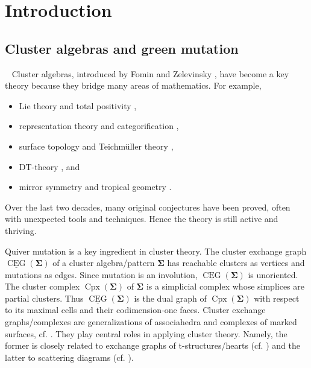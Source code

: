 \documentclass[11pt,reqno]{amsart}
\theoremstyle{plain}
\theoremstyle{definition}
\numberwithin{equation}{section}
\newcommand\<{\langle}
\renewcommand\>{\rangle}
\newcommand{\CEG}{\operatorname{CEG}} %
\newcommand{\uCEG}{\underline{\CEG}} %
\newcommand{\on}[1]{\operatorname{#1}}
\def\CCx{\on{Cpx}}   %
\def\seeds{\mathbf{\Sigma}}
\begin{document}
\section{Introduction}
\subsection{Cluster algebras and green mutation}\
Cluster algebras, introduced by Fomin and Zelevinsky \cite{FZ,FZ03,FZ07}, have become a key theory because they bridge many areas of mathematics. For example,
\begin{itemize}
    \item Lie theory and total positivity \cite{BFZ},
    \item representation theory and categorification \cite{BMRRT,Ke4},
    \item surface topology and Teichm\"uller theory \cite{FST,FG},
    \item DT-theory \cite{KS,Nag,Ke2}, and
    \item mirror symmetry and tropical geometry \cite{GHKK18}.
\end{itemize}
Over the last two decades, many original conjectures have been proved, often with unexpected tools and techniques. Hence the theory is still active and thriving.

Quiver mutation is a key ingredient in cluster theory.
The cluster exchange graph $\uCEG(\seeds)$ of a cluster algebra/pattern $\seeds$ has reachable clusters as vertices and mutations as edges. 
Since mutation is an involution, $\uCEG(\seeds)$ is unoriented. 
The cluster complex $\CCx(\seeds)$ of $\seeds$ is a simplicial complex whose simplices are partial clusters. 
Thus $\uCEG(\seeds)$ is the dual graph of $\CCx(\seeds)$ with respect to its maximal cells and their codimension-one faces.
Cluster exchange graphs/complexes are generalizations of associahedra and complexes of marked surfaces, cf. \cite{FZ03,FST}. 
They play central roles in applying cluster theory. 
Namely, the former is closely related to exchange graphs of t-structures/hearts (cf. \cite{KQ1}) and the latter to scattering diagrams (cf. \cite{Nak}).
\end{document}
